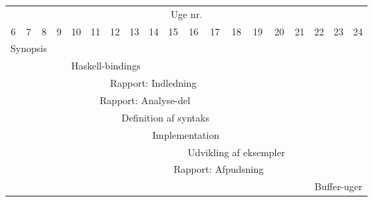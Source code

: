 \documentclass[a4paper,oneside, draft]{memoir}
\begin{document}
\begin{landscape}
\begin{center}



\begin{tabular}{ccccccccccccccccccc}
\multicolumn{19}{c}{Uge nr.} \\
6 & 7 & 8 & 9 & 10 & 11 & 12 & 13 & 14 & 15 & 16 & 17 & 18 &
19 & 20 & 21 & 22 & 23 & 24\\ \hline \hline
\multicolumn{3}{c}{\cellcolor{black} \color{white}  Synopsis } \\  
& & \multicolumn{2}{c}{\cellcolor{cyan} \color{white}} & \multicolumn{6}{l}{Haskell-bindings} \\
& & & \multicolumn{3}{c}{\cellcolor{lightgrey} \color{white} } & \multicolumn{6}{l}{Rapport: Indledning} \\
& & & & & \multicolumn{6}{c}{\cellcolor{grey} \color{white} Rapport: Analyse-del} \\
& & & & & &  \multicolumn{6}{c}{\cellcolor{magenta} \color{white} Definition af
  syntaks} \\
& & & & & & & \multicolumn{6}{c}{\cellcolor{blue} \color{white} Implementation} \\
\multicolumn{10}{r}{} & \multicolumn{5}{c}{\cellcolor{red} Udvikling
  af eksempler}
 \\
\multicolumn{14}{r}{Rapport: Afpudsning} & \multicolumn{2}{c}{\cellcolor{yellow}}
 \\
\multicolumn{16}{r}{} & \multicolumn{3}{c}{\cellcolor{green} Buffer-uger} \\  
\end{tabular}
\end{center}
\end{landscape}
\end{document}
